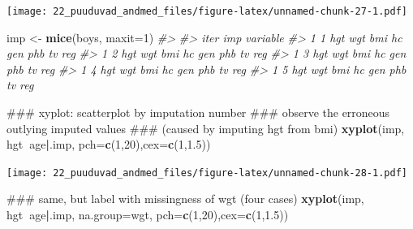 \documentclass[]{book}
\newenvironment{Shaded}{\begin{snugshade}}{\end{snugshade}}
\newcommand{\KeywordTok}[1]{\textcolor[rgb]{0.13,0.29,0.53}{\textbf{#1}}}
\newcommand{\DataTypeTok}[1]{\textcolor[rgb]{0.13,0.29,0.53}{#1}}
\newcommand{\DecValTok}[1]{\textcolor[rgb]{0.00,0.00,0.81}{#1}}
\newcommand{\FloatTok}[1]{\textcolor[rgb]{0.00,0.00,0.81}{#1}}
\newcommand{\StringTok}[1]{\textcolor[rgb]{0.31,0.60,0.02}{#1}}
\newcommand{\CommentTok}[1]{\textcolor[rgb]{0.56,0.35,0.01}{\textit{#1}}}
\newcommand{\OperatorTok}[1]{\textcolor[rgb]{0.81,0.36,0.00}{\textbf{#1}}}
\newcommand{\NormalTok}[1]{#1}
\begin{document}
\begin{Shaded}
\end{Shaded}

\texttt{[image: 22\_puuduvad\_andmed\_files/figure-latex/unnamed-chunk-27-1.pdf]}

\begin{Shaded}
\begin{Highlighting}[]
\NormalTok{imp <-}\StringTok{ }\KeywordTok{mice}\NormalTok{(boys, }\DataTypeTok{maxit=}\DecValTok{1}\NormalTok{)}
\CommentTok{#> }
\CommentTok{#>  iter imp variable}
\CommentTok{#>   1   1  hgt  wgt  bmi  hc  gen  phb  tv  reg}
\CommentTok{#>   1   2  hgt  wgt  bmi  hc  gen  phb  tv  reg}
\CommentTok{#>   1   3  hgt  wgt  bmi  hc  gen  phb  tv  reg}
\CommentTok{#>   1   4  hgt  wgt  bmi  hc  gen  phb  tv  reg}
\CommentTok{#>   1   5  hgt  wgt  bmi  hc  gen  phb  tv  reg}

\NormalTok{### xyplot: scatterplot by imputation number}
\NormalTok{### observe the erroneous outlying imputed values}
\NormalTok{### (caused by imputing hgt from bmi)}
\KeywordTok{xyplot}\NormalTok{(imp, hgt}\OperatorTok{~}\NormalTok{age}\OperatorTok{|}\NormalTok{.imp, }\DataTypeTok{pch=}\KeywordTok{c}\NormalTok{(}\DecValTok{1}\NormalTok{,}\DecValTok{20}\NormalTok{),}\DataTypeTok{cex=}\KeywordTok{c}\NormalTok{(}\DecValTok{1}\NormalTok{,}\FloatTok{1.5}\NormalTok{))}
\end{Highlighting}
\end{Shaded}

\texttt{[image: 22\_puuduvad\_andmed\_files/figure-latex/unnamed-chunk-28-1.pdf]}

\begin{Shaded}
\begin{Highlighting}[]
\NormalTok{### same, but label with missingness of wgt (four cases)}
\KeywordTok{xyplot}\NormalTok{(imp, hgt}\OperatorTok{~}\NormalTok{age}\OperatorTok{|}\NormalTok{.imp, }\DataTypeTok{na.group=}\NormalTok{wgt, }\DataTypeTok{pch=}\KeywordTok{c}\NormalTok{(}\DecValTok{1}\NormalTok{,}\DecValTok{20}\NormalTok{),}\DataTypeTok{cex=}\KeywordTok{c}\NormalTok{(}\DecValTok{1}\NormalTok{,}\FloatTok{1.5}\NormalTok{))}
\end{Highlighting}
\end{Shaded}
\end{document}
